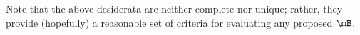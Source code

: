 Note that the above desiderata are neither complete nor unique; rather, they provide (hopefully) a reasonable set of criteria for evaluating any proposed $\mB$. 
% 
% 
% 
% 
% 
% 
% 
